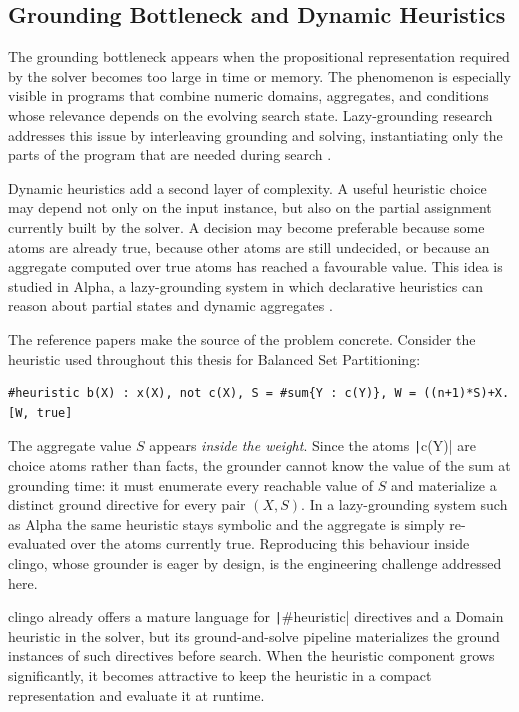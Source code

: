 \subsection{Grounding Bottleneck and Dynamic Heuristics}

The grounding bottleneck appears when the propositional representation required by the solver becomes too large in time or memory. The phenomenon is especially visible in programs that combine numeric domains, aggregates, and conditions whose relevance depends on the evolving search state. Lazy-grounding research addresses this issue by interleaving grounding and solving, instantiating only the parts of the program that are needed during search \cite{comploi2023domain}.

Dynamic heuristics add a second layer of complexity. A useful heuristic choice may depend not only on the input instance, but also on the partial assignment currently built by the solver. A decision may become preferable because some atoms are already true, because other atoms are still undecided, or because an aggregate computed over true atoms has reached a favourable value. This idea is studied in Alpha, a lazy-grounding system in which declarative heuristics can reason about partial states and dynamic aggregates \cite{comploi2023domain,comploi2023dynamicAggregates}.

The reference papers make the source of the problem concrete. Consider the heuristic used throughout this thesis for Balanced Set Partitioning:

\begin{verbatim}
#heuristic b(X) : x(X), not c(X), S = #sum{Y : c(Y)}, W = ((n+1)*S)+X. [W, true]
\end{verbatim}

The aggregate value $S$ appears \emph{inside the weight}. Since the atoms \texttt|c(Y)| are choice atoms rather than facts, the grounder cannot know the value of the sum at grounding time: it must enumerate every reachable value of $S$ and materialize a distinct ground directive for every pair $(X,S)$. In a lazy-grounding system such as Alpha the same heuristic stays symbolic and the aggregate is simply re-evaluated over the atoms currently true. Reproducing this behaviour inside clingo, whose grounder is eager by design, is the engineering challenge addressed here.

clingo already offers a mature language for \texttt|#heuristic| directives and a Domain heuristic in the solver, but its ground-and-solve pipeline materializes the ground instances of such directives before search. When the heuristic component grows significantly, it becomes attractive to keep the heuristic in a compact representation and evaluate it at runtime.

